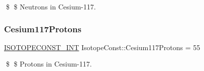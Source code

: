 \$ \$ Neutrons in Cesium-\/117. \mbox{\label{group___isotope_const-_cesium-_cs117_ga0ac83bc361caba960ad1070c598fc9f9}} 
\subsubsection{\texorpdfstring{Cesium117\+Protons}{Cesium117Protons}}
{\footnotesize\ttfamily \mbox{\hyperlink{group___isotope_const-_macros_ga5f18360b3e99483a35c32d789e62621c}{I\+S\+O\+T\+O\+P\+E\+C\+O\+N\+S\+T\+\_\+\+I\+NT}} Isotope\+Const\+::\+Cesium117\+Protons = 55}

\$ \$ Protons in Cesium-\/117. 